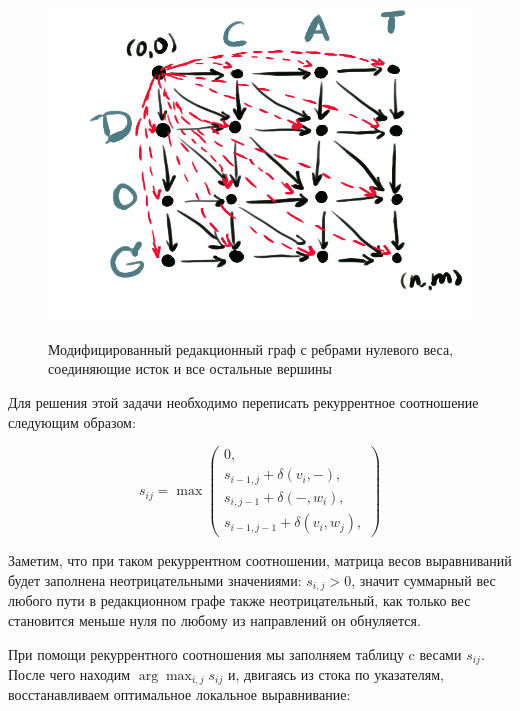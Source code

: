 \documentclass[letterpaper, 11pt]{article}
\begin{document}
\begin{figure}
  \centering
  \includegraphics[width=0.7\linewidth]{images/edit_graph_modified.png}\\
  \caption{Модифицированный редакционный граф с ребрами нулевого веса, соединяющие исток и все остальные вершины}\label{fig:third}
\end{figure}

Для решения этой задачи необходимо переписать рекуррентное соотношение следующим образом:

$$s_{ij}=
\max
\begin{pmatrix}
	0, \\
	s_{i-1,j}+\delta(v_i,-), \\
	s_{i,j-1}+\delta(-,w_i), \\
	s_{i-1,j-1}+\delta(v_i,w_j),
\end{pmatrix}$$

Заметим, что при таком рекуррентном соотношении, матрица весов выравниваний будет заполнена неотрицательными значениями: $s_{i,j}>0$, значит суммарный вес любого пути в редакционном графе также неотрицательный, как только вес становится меньше нуля по любому из направлений он обнуляется.

При помощи рекуррентного соотношения мы заполняем таблицу c весами $s_{ij}$. После чего находим $\arg\max_{i,j}s_{ij}$ и, двигаясь из стока по указателям, восстанавливаем оптимальное локальное выравнивание:
\end{document}
